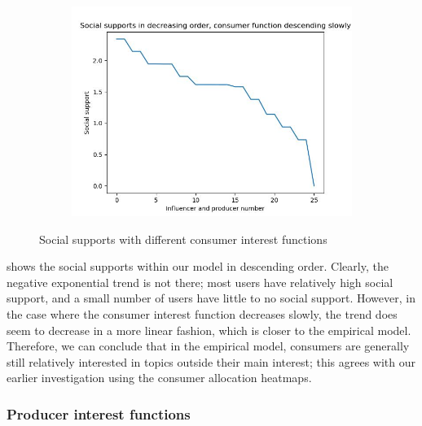 \documentclass[11pt, letterpaper]{article}
\begin{document}
\begin{figure}[h]
\begin{adjustbox}{max width=1.5\textwidth,center}
\begin{subfigure}[b]{0.45\textwidth}
    \end{subfigure}
    \begin{subfigure}[b]{0.45\textwidth}
        \includegraphics[width=\linewidth]{"figures/f/descending slowly_supps.jpg"}
    \end{subfigure}
\end{adjustbox}
\caption{Social supports with different consumer interest functions}
\label{fig:f_supps}
\end{figure}

 shows the social supports within our model in descending order. Clearly, the negative exponential trend is not there; most users have relatively high social support, and a small number of users have little to no social support. However, in the case where the consumer interest function decreases slowly, the trend does seem to decrease in a more linear fashion, which is closer to the empirical model. Therefore, we can conclude that in the empirical model, consumers are generally still relatively interested in topics outside their main interest; this agrees with our earlier investigation using the consumer allocation heatmaps. 

\subsubsection{Producer interest functions}
\end{document}
